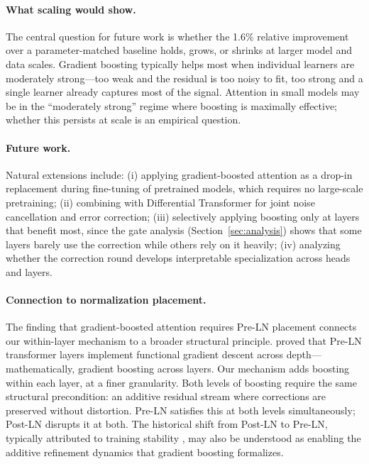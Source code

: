 \documentclass{article}
\theoremstyle{definition}
\begin{document}
\paragraph{What scaling would show.}
The central question for future work is whether the 1.6\% relative improvement over a parameter-matched baseline holds, grows, or shrinks at larger model and data scales.
Gradient boosting typically helps most when individual learners are moderately strong---too weak and the residual is too noisy to fit, too strong and a single learner already captures most of the signal.
Attention in small models may be in the ``moderately strong'' regime where boosting is maximally effective; whether this persists at scale is an empirical question.

\paragraph{Future work.}
Natural extensions include: (i) applying gradient-boosted attention as a drop-in replacement during fine-tuning of pretrained models, which requires no large-scale pretraining; (ii) combining with Differential Transformer for joint noise cancellation and error correction; (iii) selectively applying boosting only at layers that benefit most, since the gate analysis (Section~\ref{sec:analysis}) shows that some layers barely use the correction while others rely on it heavily; (iv) analyzing whether the correction round develops interpretable specialization across heads and layers.

\paragraph{Connection to normalization placement.}
The finding that gradient-boosted attention requires Pre-LN placement connects our within-layer mechanism to a broader structural principle.
\citet{cheng2024transformers} proved that Pre-LN transformer layers implement functional gradient descent across depth---mathematically, gradient boosting across layers.
Our mechanism adds boosting within each layer, at a finer granularity.
Both levels of boosting require the same structural precondition: an additive residual stream where corrections are preserved without distortion.
Pre-LN satisfies this at both levels simultaneously; Post-LN disrupts it at both.
The historical shift from Post-LN \citep{vaswani2017attention} to Pre-LN, typically attributed to training stability \citep{xiong2020layer}, may also be understood as enabling the additive refinement dynamics that gradient boosting formalizes.
\end{document}
